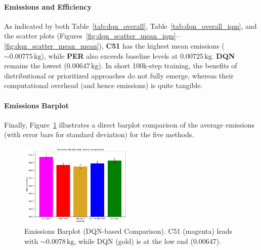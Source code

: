 \paragraph{Emissions and Efficiency}
As indicated by both Table~\ref{tab:dqn_overall}, Table~\ref{tab:dqn_overall_iqm}, 
and the scatter plots (Figures~\ref{fig:dqn_scatter_mean_iqm}--\ref{fig:dqn_scatter_mean_mean}), 
\textbf{C51} has the highest mean emissions ($\sim0.00775\,\mathrm{kg}$), 
while \textbf{PER} also exceeds baseline levels at $0.00725\,\mathrm{kg}$. 
\textbf{DQN} remains the lowest ($0.00647\,\mathrm{kg}$). 
In short 100k-step training, the benefits of distributional or prioritized approaches 
do not fully emerge, whereas their computational overhead (and hence emissions) is quite tangible.

\paragraph{Emissions Barplot}

Finally, Figure~\ref{fig:dqn_comp_emissions_bar} illustrates a direct barplot comparison
of the average emissions (with error bars for standard deviation) for the five methods.
\begin{figure}[htb]
	\centering
	\includegraphics[width=0.48\textwidth]{figures/dqn_based_comparison/barplot_emissions_dqn_based_comparison.png}
	\caption{Emissions Barplot (DQN-based Comparison). 
		C51 (magenta) leads with $\sim 0.0078\,\mathrm{kg}$, while DQN (gold) is at the low end ($0.00647$).}
	\label{fig:dqn_comp_emissions_bar}
\end{figure}

